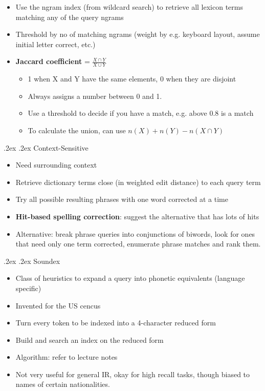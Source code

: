 \documentclass[10pt,landscape,a4paper]{article}
\makeatletter
\renewcommand{\subsection}{\@startsection{subsection}{1}{0mm}%
  {.2ex}%
  {.2ex}%
{\sffamily\bfseries}}
\renewcommand{\subsubsection}{\@startsection{subsubsection}{1}{0mm}%
  {.2ex}%
  {.2ex}%
{\rmfamily\bfseries}}
\makeatother
\begin{document}
\begin{multicols*}{3}
\begin{enumerate}
\begin{itemize}
      \item Use the ngram index (from wildcard search) to retrieve all lexicon terms matching any of the query ngrams
      \item Threshold by no of matching ngrams (weight by e.g. keyboard layout, assume initial letter correct, etc.)
      \item \textbf{Jaccard coefficient} = $\frac{X\cap Y}{X \cup Y}$
      \begin{itemize}
        \item 1 when X and Y have the same elements, 0 when they are disjoint
        \item Always assigns a number between 0 and 1.
        \item Use a threshold to decide if you have a match, e.g. above 0.8 is a match
        \item To calculate the union, can use $n(X) + n(Y) - n(X \cap Y)$
      \end{itemize}
    \end{itemize}
  \end{enumerate}
  \subsubsection{Context-Sensitive}
  \begin{itemize}
    \item Need surrounding context
    \item Retrieve dictionary terms close (in weighted edit distance) to each query term
    \item Try all possible resulting phrases with one word corrected at a time
    \item \textbf{Hit-based spelling correction}: suggest the alternative that has lots of hits
    \item Alternative: break phrase queries into conjunctions of biwords, look for ones that need only one term corrected, enumerate phrase matches and rank them.
  \end{itemize}
  \subsection{Soundex}
  \begin{itemize}
    \item Class of heuristics to expand a query into phonetic equivalents (language specific)
    \item Invented for the US cencus
    \item Turn every token to be indexed into a 4-character reduced form
    \item Build and search an index on the reduced form
    \item Algorithm: refer to lecture notes
    \item Not very useful for general IR, okay for high recall tasks, though biased to names of certain nationalities.
  \end{itemize}
\end{multicols*}
\end{document}
